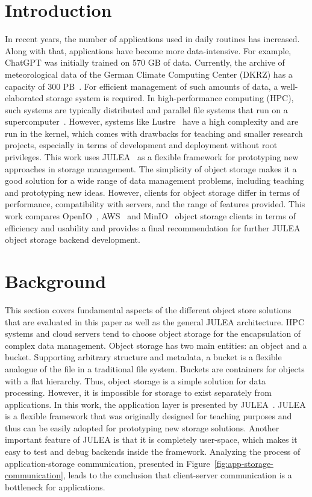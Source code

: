 \documentclass[conference]{IEEEtran}
\begin{document}
\section{Introduction}
In recent years, the number of applications used in daily routines has increased. Along with that, applications have become more data-intensive. For example, ChatGPT was initially trained on 570 GB of data.
Currently, the archive of meteorological data of the German Climate Computing Center (DKRZ) has a capacity of 300 PB~\cite{NODBLP:dkrz-archive-size}.  For efficient management of such amounts of data, a well-elaborated storage system is required. 
In high-performance computing (HPC), such systems are typically distributed and parallel file systems that run on a supercomputer~\cite{DBLP:journals/superfri/Luttgau0DABK018}.
However, systems like Lustre~\cite{DBLP:conf/sc/TaoDBN12} have a high complexity and are run in the kernel, which comes with drawbacks for teaching and smaller research projects, especially in terms of development and deployment without root privileges. This work uses JULEA~\cite{DBLP:conf/supercomputer/Kuhn17} as a flexible framework for prototyping new approaches in storage management.
The simplicity of object storage makes it a good solution for a wide range of data management problems, including teaching and prototyping new ideas. However, clients for object storage differ in terms of performance, compatibility with servers, and the range of features provided. This work compares OpenIO~\cite{NODBLP:openio}, AWS~\cite{NODLBP:aws} and MinIO~\cite{NODLBP:minio} object storage clients in terms of efficiency and usability and provides a final recommendation for further JULEA object storage backend development.

\section{Background}

This section covers fundamental aspects of the different object store solutions that are evaluated in this paper as well as the general JULEA architecture.
HPC systems and cloud servers tend to choose object storage for the encapsulation of complex data management. Object storage has two main entities: an object and a bucket. Supporting arbitrary structure and metadata, a bucket is a flexible analogue of the file in a traditional file system. Buckets are containers for objects with a flat hierarchy. Thus, object storage is a simple solution for data processing. However, it is impossible for storage to exist separately from applications. In this work, the application layer is presented by JULEA~\cite{DBLP:conf/supercomputer/Kuhn17}. JULEA is a flexible framework that was originally designed for teaching purposes and thus can be easily adopted for prototyping new storage solutions. Another important feature of JULEA is that it is completely user-space, which makes it easy to test and debug backends inside the framework. Analyzing the process of application-storage communication, presented in Figure~\ref{fig:app-storage-communication}, leads to the conclusion that client-server communication is a bottleneck for applications.
\end{document}
